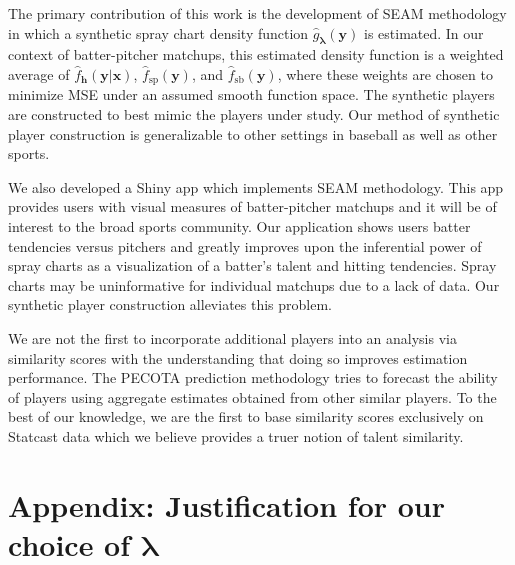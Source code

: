 \documentclass[12pt]{article}
\newcommand{\y}{\textbf{y}}
\newcommand{\x}{\textbf{x}}
\newcommand{\h}{\textbf{h}}
\newcommand{\lambdabf}{\boldsymbol{\lambda}}
\begin{document}
The primary contribution of this work is the development of SEAM methodology in which a synthetic spray chart density function $\hat{g}_{\lambdabf}(\y)$ is estimated. In our context of batter-pitcher matchups, this estimated density function is a weighted average of $\hat f_\h(\y|\x)$, $\hat f_{\text{sp}}(\y)$, and $\hat f_{\text{sb}}(\y)$, where these weights are chosen to minimize MSE under an assumed smooth function space. The synthetic players are constructed to best mimic the players under study. Our method of synthetic player construction is generalizable to other settings in baseball as well as other sports.

We also developed a Shiny app which implements SEAM methodology. This app provides users with visual measures of batter-pitcher matchups and it will be of interest to the broad sports community. Our application shows users batter tendencies versus pitchers and greatly improves upon the inferential power of spray charts \citep{pettispray, marchi2019analyzing} as a visualization of a batter's talent and hitting tendencies. Spray charts may be uninformative for individual matchups due to a lack of data. Our synthetic player construction alleviates this problem.

We are not the first to incorporate additional players into an analysis via similarity scores with the understanding that doing so improves estimation performance. The PECOTA prediction methodology \citep{PECOTA} tries to forecast the ability of players using aggregate estimates obtained from other similar players. To the best of our knowledge, we are the first to base similarity scores exclusively on Statcast data which we believe provides a truer notion of talent similarity.







\section*{Appendix: Justification for our choice of $\lambdabf$}
\end{document}

